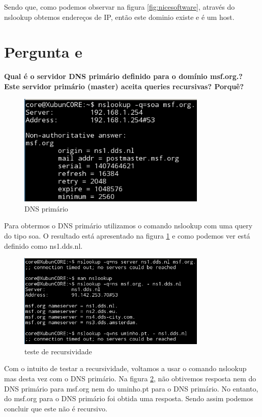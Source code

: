 \documentclass[a4paper]{report}
\begin{document}
Sendo que, como podemos observar na figura \ref{fig:nicesoftware}, através do nslookup
obtemos endereços de IP, então este dominio existe e é um host.

\section{Pergunta e}
\textbf{Qual é o servidor DNS primário definido para o domínio msf.org.? Este
servidor primário (master) aceita queries recursivas? Porquê?}

\begin{figure}[H]
    \centering 
    \includegraphics[width=0.8\textwidth]{images/dnsprimario.png}  
    \caption{DNS primário}
    \label{fig:dnsprimario}
\end{figure}

Para obtermos o DNS primário utilizamos o comando nslookup com uma query
do tipo soa. O resultado está apresentado na figura \ref{fig:dnsprimario} e
como podemos ver está definido como ns1.dds.nl.

\begin{figure}[H]
    \centering 
    \includegraphics[width=0.8\textwidth]{images/recursivo.png}  
    \caption{teste de recursividade}
    \label{fig:recursivo}
\end{figure}

Com o intuito de testar a recursividade, voltamos a usar o comando nslookup
mas desta vez com o DNS primário. Na figura \ref{fig:recursivo}, não obtivemos
resposta nem do DNS primário para msf.org nem do uminho.pt para o DNS primário.
No entanto, do msf.org para o DNS primário foi obtida uma resposta. Sendo assim
podemos concluir que este não é recursivo.
\end{document}
